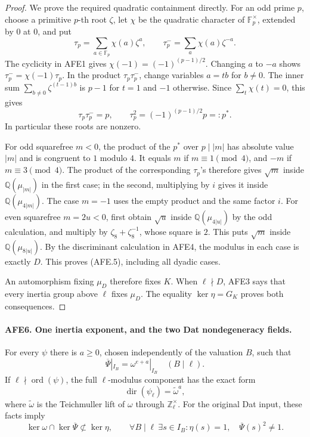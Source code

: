 \begin{proof}
We prove the required quadratic containment directly.
For an odd prime \(p\), choose a primitive \(p\)-th
root \(\zeta\), let \(\chi\) be the quadratic character
of \(\mathbb F_p^\times\), extended by \(0\) at \(0\),
and put
\[
       \tau_p=\sum_{a\in\mathbb F_p}\chi(a)\zeta^a,\qquad
       \tau_p^-=\sum_a\chi(a)\zeta^{-a}.
 \]
The cyclicity in AFE1 gives
\(\chi(-1)=(-1)^{(p-1)/2}\).  Changing \(a\) to \(-a\)
shows \(\tau_p^-=\chi(-1)\tau_p\).
In the product \(\tau_p\tau_p^-\), change variables
\(a=tb\) for \(b\ne0\).  The inner sum
\(\sum_{b\ne0}\zeta^{(t-1)b}\) is \(p-1\) for
\(t=1\) and \(-1\) otherwise.  Since
\(\sum_t\chi(t)=0\), this gives
\[
              \tau_p\tau_p^-=p,\qquad
              \tau_p^2=(-1)^{(p-1)/2}p=:p^*.
                                                        \tag{AFE.6}
\]
In particular these roots are nonzero.

For odd squarefree \(m<0\), the product of the \(p^*\)
over \(p\mid |m|\) has absolute value \(|m|\) and is
congruent to \(1\) modulo \(4\).  It equals \(m\) if
\(m\equiv1\pmod4\), and \(-m\) if \(m\equiv3\pmod4\).
The product of the corresponding \(\tau_p\)'s therefore
gives \(\sqrt m\) inside \(\mathbb Q(\mu_{|m|})\) in
the first case; in the second, multiplying by \(i\)
gives it inside \(\mathbb Q(\mu_{4|m|})\).
The case \(m=-1\) uses the empty product and the same
factor \(i\).
For even squarefree \(m=2u<0\), first obtain
\(\sqrt u\) inside \(\mathbb Q(\mu_{4|u|})\) by the
odd calculation, and multiply by
\(\zeta_8+\zeta_8^{-1}\), whose square is \(2\).
This puts \(\sqrt m\) inside
\(\mathbb Q(\mu_{8|u|})\).
By the discriminant calculation in AFE4, the modulus
in each case is exactly \(D\).
This proves (AFE.5), including all dyadic cases.

An automorphism fixing \(\mu_D\) therefore fixes \(K\).
When \(\ell\nmid D\), AFE3 says that every inertia
group above \(\ell\) fixes \(\mu_D\).
The equality \(\ker\eta=G_K\) proves both consequences.
\end{proof}

\paragraph{AFE6. One inertia exponent, and the two Dat nondegeneracy fields.}
\label{claim:AFE6}
For every \(\psi\) there is \(a\ge0\), chosen independently
of the valuation \(B\), such that
\[
       \overline\Psi|_{I_B}=\omega^{e+a}|_{I_B}
                       \quad(B\mid\ell).                 \tag{AFE.7}
\]
If \(\ell\nmid\operatorname{ord}(\psi)\), the full
\(\ell\)-modulus component has the exact form
\[
       \operatorname{dir}(\psi_\ell)=\widetilde\omega^a,
                                                        \tag{AFE.8}
\]
where \(\widetilde\omega\) is the Teichmuller lift of
\(\omega\) through \(\mathbb Z_\ell^\times\).
For the original Dat input, these facts imply
\[
 \ker\omega\cap\ker\overline\Psi\not\subset\ker\eta,\qquad
 \forall B\mid\ell\ \exists s\in I_B:
                  \eta(s)=1,\quad\overline\Psi(s)^2\ne1.
                                                        \tag{AFE.9}
\]

